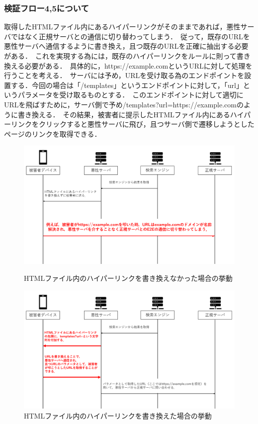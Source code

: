 \documentclass[dvipdfmx]{jsarticle}
\begin{document}
            \subsubsection{検証フロー4,5について}
                取得したHTMLファイル内にあるハイパーリンクがそのままであれば，悪性サーバではなく正規サーバとの通信に切り替わってしまう．\
                従って，既存のURLを悪性サーバへ通信するように書き換え，且つ既存のURLを正確に抽出する必要がある．\
                これを実現する為には，既存のハイパーリンクをルールに則って書き換える必要がある．\
                具体的に，https://example.comというURLに対して処理を行うことを考える．\
                サーバには予め，URLを受け取る為のエンドポイントを設置する．今回の場合は「/templates」というエンドポイントに対して，「url」というパラメータを受け取るものとする．\
                このエンドポイントに対して適切にURLを飛ばすために，サーバ側で予め/templates?url=https://example.comのように書き換える．\
                その結果，被害者に提示したHTMLファイル内にあるハイパーリンクをクリックすると悪性サーバに飛び，且つサーバ側で遷移しようとしたページのリンクを取得できる．
                \begin{figure}
                    \centering
                    \includegraphics[width=15cm]{img/vc-vf-4-5-00.png}
                    \caption{HTMLファイル内のハイパーリンクを書き換えなかった場合の挙動}
                    \label{flow-no45-00}
                    \includegraphics[width=15cm]{img/vc-vf-4-5-01.png}
                    \caption{HTMLファイル内のハイパーリンクを書き換えた場合の挙動}
                    \label{flow-no45-01}
                \end{figure}
\end{document}
